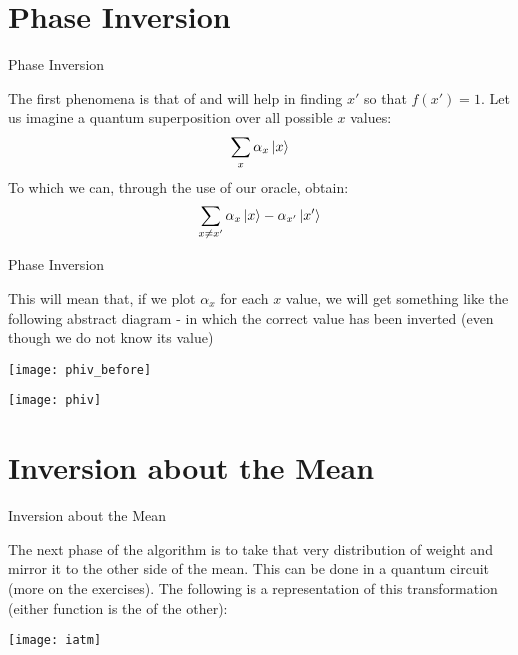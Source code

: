 \documentclass[aspectratio=43]{beamer}
\begin{document}
\section{Phase Inversion}
\begin{frame}{Phase Inversion}
    \begin{card}
        The first phenomena is that of \phiv and will help in finding $x'$ so that $f(x')=1$. Let us imagine a quantum superposition over all possible $x$ values:
        \begin{equation*}
            \sum_x\alpha_x \ket{x}
        \end{equation*}
        To which we can, through the use of our oracle, obtain:
        \begin{equation*}
            \sum_{x\neq x'}\alpha_x \ket{x} - \alpha_{x'}\ket{x'}
        \end{equation*}
    \end{card}
\pagenumber
\end{frame}
\begin{frame}{Phase Inversion}
    \begin{cardTiny}
        This will mean that, if we plot $\alpha_x$ for each $x$ value, we will get something like the following abstract diagram - in which the correct value has been inverted (even though we do not know its value)
        \begin{multicols}{2}
            \begin{center}
                \texttt{[image: phiv\_before]}
            \end{center}
            \begin{center}
                \texttt{[image: phiv]}
            \end{center}
        \end{multicols}
    \end{cardTiny}
\pagenumber
\end{frame}


\section{Inversion about the Mean}
\begin{frame}{Inversion about the Mean}
    \begin{cardTiny}
    The next phase of the algorithm is to take that very distribution of weight and mirror it to the other side of the mean. This can be done in a quantum circuit (more on the exercises). The following is a representation of this transformation (either function is the \iatm of the other):
    \begin{center}
        \texttt{[image: iatm]}
    \end{center}
    \end{cardTiny}
\pagenumber
\end{frame}
\end{document}
